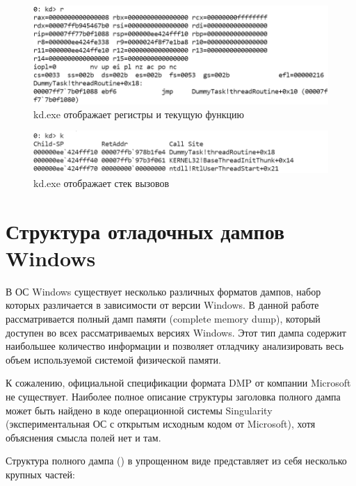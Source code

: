 \documentclass{mipt-thesis-bs}
\begin{document}
\begin{figure}[h]
\begin{center}
    \includegraphics[width=1\textwidth]{r.png}
    \caption{kd.exe отображает регистры и текущую функцию}
    \label{fig:kdr}
\end{center}
\end{figure}

\begin{figure}[h]
\begin{center}
    \includegraphics[width=1\textwidth]{k.png}
    \caption{kd.exe отображает стек вызовов}
    \label{fig:kdk}
\end{center}
\end{figure}


\chapter{Структура отладочных дампов Windows}

В ОС Windows существует несколько различных форматов дампов, набор которых различается в зависимости от версии Windows\cite{dumps}. В данной работе рассматривается полный дамп памяти (complete memory dump), который доступен во всех рассматриваемых версиях Windows. Этот тип дампа содержит наибольшее количество информации и позволяет отладчику анализировать весь объем используемой системой физической памяти\cite{completedump}.

К сожалению, официальной спецификации формата DMP от компании Microsoft не существует. Наиболее полное описание структуры заголовка полного дампа может быть найдено в коде операционной системы Singularity (экспериментальная ОС с открытым исходным кодом от Microsoft)\cite{mssing}, хотя объяснения смысла полей нет и там.

Структура полного дампа () в упрощенном виде представляет из себя несколько крупных частей:
\end{document}
